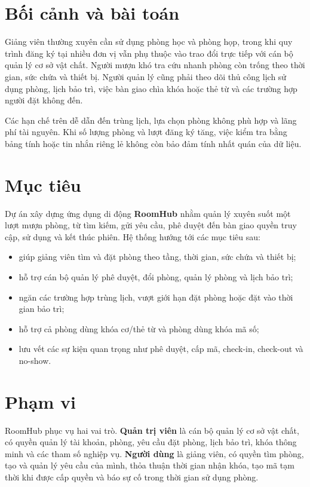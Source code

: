 \section{Bối cảnh và bài toán}

Giảng viên thường xuyên cần sử dụng phòng học và phòng họp, trong khi quy trình đăng ký tại nhiều đơn vị vẫn phụ thuộc vào trao đổi trực tiếp với cán bộ quản lý cơ sở vật chất. Người mượn khó tra cứu nhanh phòng còn trống theo thời gian, sức chứa và thiết bị. Người quản lý cũng phải theo dõi thủ công lịch sử dụng phòng, lịch bảo trì, việc bàn giao chìa khóa hoặc thẻ từ và các trường hợp người đặt không đến.

Các hạn chế trên dễ dẫn đến trùng lịch, lựa chọn phòng không phù hợp và lãng phí tài nguyên. Khi số lượng phòng và lượt đăng ký tăng, việc kiểm tra bằng bảng tính hoặc tin nhắn riêng lẻ không còn bảo đảm tính nhất quán của dữ liệu.

\section{Mục tiêu}

Dự án xây dựng ứng dụng di động \textbf{RoomHub} nhằm quản lý xuyên suốt một lượt mượn phòng, từ tìm kiếm, gửi yêu cầu, phê duyệt đến bàn giao quyền truy cập, sử dụng và kết thúc phiên. Hệ thống hướng tới các mục tiêu sau:

\begin{itemize}
  \item giúp giảng viên tìm và đặt phòng theo tầng, thời gian, sức chứa và thiết bị;
  \item hỗ trợ cán bộ quản lý phê duyệt, đổi phòng, quản lý phòng và lịch bảo trì;
  \item ngăn các trường hợp trùng lịch, vượt giới hạn đặt phòng hoặc đặt vào thời gian bảo trì;
  \item hỗ trợ cả phòng dùng khóa cơ/thẻ từ và phòng dùng khóa mã số;
  \item lưu vết các sự kiện quan trọng như phê duyệt, cấp mã, check-in, check-out và no-show.
\end{itemize}

\section{Phạm vi}

RoomHub phục vụ hai vai trò. \textbf{Quản trị viên} là cán bộ quản lý cơ sở vật chất, có quyền quản lý tài khoản, phòng, yêu cầu đặt phòng, lịch bảo trì, khóa thông minh và các tham số nghiệp vụ. \textbf{Người dùng} là giảng viên, có quyền tìm phòng, tạo và quản lý yêu cầu của mình, thỏa thuận thời gian nhận khóa, tạo mã tạm thời khi được cấp quyền và báo sự cố trong thời gian sử dụng phòng.

